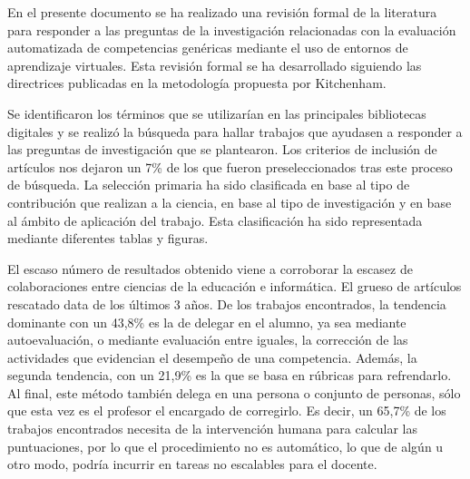 


En el presente documento se ha realizado una revisión formal de la literatura para responder a las preguntas de la investigación relacionadas con la evaluación automatizada de competencias genéricas mediante el uso de entornos de aprendizaje virtuales. Esta revisión formal se ha desarrollado siguiendo las directrices publicadas en la metodología propuesta por Kitchenham.

Se identificaron los términos que se utilizarían en las principales bibliotecas digitales y se realizó la búsqueda para hallar trabajos que ayudasen a responder a las preguntas de investigación que se plantearon. Los criterios de inclusión de artículos nos dejaron un 7\% de los que fueron preseleccionados tras este proceso de búsqueda. La selección primaria ha sido clasificada en base al tipo de contribución que realizan a la ciencia, en base al tipo de investigación y en base al ámbito de aplicación del trabajo. Esta clasificación ha sido representada mediante diferentes tablas y figuras.

El escaso número de resultados obtenido viene a corroborar la escasez de colaboraciones entre ciencias de la educación e informática. El grueso de artículos rescatado data de los últimos 3 años. De los trabajos encontrados, la tendencia dominante con un 43,8\% es la de delegar en el alumno, ya sea mediante autoevaluación, o mediante evaluación entre iguales, la corrección de las actividades que evidencian el desempeño de una competencia. Además, la segunda tendencia, con un 21,9\% es la que se basa en rúbricas para refrendarlo. Al final, este método también delega en una persona o conjunto de personas, sólo que esta vez es el profesor el encargado de corregirlo. Es decir, un 65,7\% de los trabajos encontrados necesita de la intervención humana para calcular las puntuaciones, por lo que el procedimiento no es automático, lo que de algún u otro modo, podría incurrir en tareas no escalables para el docente.


